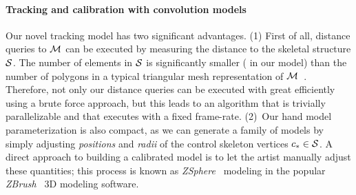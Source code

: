 \paragraph{Tracking and calibration with convolution models}
Our novel tracking model has two significant advantages. (1) First of all, distance queries to $\mathcal{M}$ can be executed by measuring the distance to the skeletal structure $\mathcal{S}$. The number of elements in $\mathcal{S}$ is significantly smaller ( in our model) than the number of polygons in a typical triangular mesh representation of $\mathcal{M}$~\cite{thiery2013sphere}. Therefore, not only our distance queries can be executed with great efficiently using a brute force approach, but this leads to an algorithm that is trivially parallelizable and that executes with a fixed frame-rate. (2)~Our hand model parameterization is also compact, as we can generate a family of models by simply adjusting \emph{positions} and \emph{radii} of the control skeleton vertices $c_* \in \mathcal{S}$. A direct approach to building a calibrated model is to let the artist manually adjust these quantities; this process is known as  \emph{ZSphere~{\textcopyright}} modeling in the popular \emph{ZBrush~\textcopyright} 3D modeling software.  


